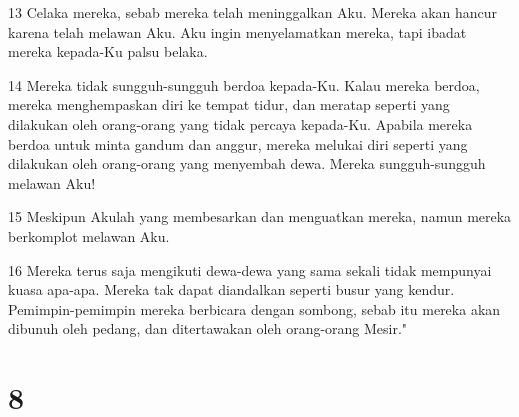 \par 13 Celaka mereka, sebab mereka telah meninggalkan Aku. Mereka akan hancur karena telah melawan Aku. Aku ingin menyelamatkan mereka, tapi ibadat mereka kepada-Ku palsu belaka.
\par 14 Mereka tidak sungguh-sungguh berdoa kepada-Ku. Kalau mereka berdoa, mereka menghempaskan diri ke tempat tidur, dan meratap seperti yang dilakukan oleh orang-orang yang tidak percaya kepada-Ku. Apabila mereka berdoa untuk minta gandum dan anggur, mereka melukai diri seperti yang dilakukan oleh orang-orang yang menyembah dewa. Mereka sungguh-sungguh melawan Aku!
\par 15 Meskipun Akulah yang membesarkan dan menguatkan mereka, namun mereka berkomplot melawan Aku.
\par 16 Mereka terus saja mengikuti dewa-dewa yang sama sekali tidak mempunyai kuasa apa-apa. Mereka tak dapat diandalkan seperti busur yang kendur. Pemimpin-pemimpin mereka berbicara dengan sombong, sebab itu mereka akan dibunuh oleh pedang, dan ditertawakan oleh orang-orang Mesir."

\chapter{8}

